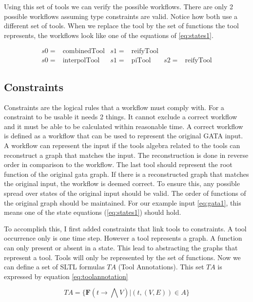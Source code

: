 \documentclass{article}
\begin{document}
Using this set of tools we can verify the possible workflows. There are only 2 possible workflows assuming type constraints are valid. Notice how both use a different set of tools. When we replace the tool by the set of functions the tool represents, the workflows look like one of the equations of \ref{eq:states1}.

\begin{align}
    s0=& \text{combinedTool} & s1=&\text{reifyTool} & &  \label{eq:solution1}\\
    s0=& \text{interpolTool} & s1=&\text{piTool} & s2=&\text{reifyTool} \label{eq:solution2} 
\end{align}

\subsection{Constraints}


Constraints are the logical rules that a workflow must comply with.
For a constraint to be usable it needs 2 things. It cannot exclude a correct workflow and it must be able to be calculated within reasonable time. 
A correct workflow is defined as a workflow that can be used to represent the original GATA input. A workflow can represent the input if the tools algebra related to the tools can reconstruct a graph that matches the input. The reconstruction is done in reverse order in comparison to the workflow. The last tool should represent the root function of the original gata graph. If there is a reconstructed graph that matches the original input, the workflow is deemed correct. 
To ensure this, any possible spread over states of the original input should be valid. The order of functions of the original graph should be maintained. For our example input \ref{eq:gata1}, this means one of the state equations (\ref{eq:states1}) should hold. 

To accomplish this, I first added constraints that link tools to constraints. A tool occurrence only is one time step. However a tool represents a graph. A function can only present or absent in a state. This lead to abstracting the graphs that represent a tool. Tools will only be represented by the set of functions. Now we can define a set of SLTL formulas $TA$ (Tool Annotations). This set $TA$ is expressed by equation \ref{eq:toolannotation} 

\begin{equation}
    TA = \{ \textbf{F}(t \rightarrow \bigwedge V) | (t,(V,E))  \in A \} \label{eq:toolannotation}
\end{equation}
\end{document}
